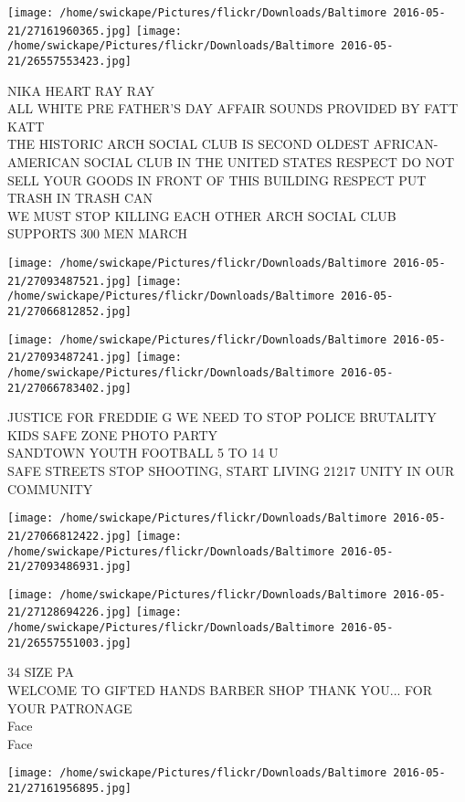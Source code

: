 \documentclass[10pt,letterpaper]{article}
\begin{document}
\texttt{[image: /home/swickape/Pictures/flickr/Downloads/Baltimore 2016-05-21/27161960365.jpg]}
\texttt{[image: /home/swickape/Pictures/flickr/Downloads/Baltimore 2016-05-21/26557553423.jpg]}

NIKA HEART RAY RAY\\
ALL WHITE PRE FATHER'S DAY AFFAIR SOUNDS PROVIDED BY FATT KATT\\
THE HISTORIC ARCH SOCIAL CLUB IS SECOND OLDEST AFRICAN{-}AMERICAN SOCIAL CLUB IN THE UNITED STATES RESPECT DO NOT SELL YOUR GOODS IN FRONT OF THIS BUILDING RESPECT PUT TRASH IN TRASH CAN\\
WE MUST STOP KILLING EACH OTHER ARCH SOCIAL CLUB SUPPORTS 300 MEN MARCH
\pagebreak

\texttt{[image: /home/swickape/Pictures/flickr/Downloads/Baltimore 2016-05-21/27093487521.jpg]}
\texttt{[image: /home/swickape/Pictures/flickr/Downloads/Baltimore 2016-05-21/27066812852.jpg]}

\texttt{[image: /home/swickape/Pictures/flickr/Downloads/Baltimore 2016-05-21/27093487241.jpg]}
\texttt{[image: /home/swickape/Pictures/flickr/Downloads/Baltimore 2016-05-21/27066783402.jpg]}

JUSTICE FOR FREDDIE G WE NEED TO STOP POLICE BRUTALITY\\
KIDS SAFE ZONE PHOTO PARTY\\
SANDTOWN YOUTH FOOTBALL 5 TO 14 U\\
SAFE STREETS STOP SHOOTING, START LIVING 21217 UNITY IN OUR COMMUNITY
\pagebreak

\texttt{[image: /home/swickape/Pictures/flickr/Downloads/Baltimore 2016-05-21/27066812422.jpg]}
\texttt{[image: /home/swickape/Pictures/flickr/Downloads/Baltimore 2016-05-21/27093486931.jpg]}

\texttt{[image: /home/swickape/Pictures/flickr/Downloads/Baltimore 2016-05-21/27128694226.jpg]}
\texttt{[image: /home/swickape/Pictures/flickr/Downloads/Baltimore 2016-05-21/26557551003.jpg]}

34 SIZE PA\\
WELCOME TO GIFTED HANDS BARBER SHOP THANK YOU... FOR YOUR PATRONAGE\\
Face\\
Face
\pagebreak

\texttt{[image: /home/swickape/Pictures/flickr/Downloads/Baltimore 2016-05-21/27161956895.jpg]}
\end{document}
